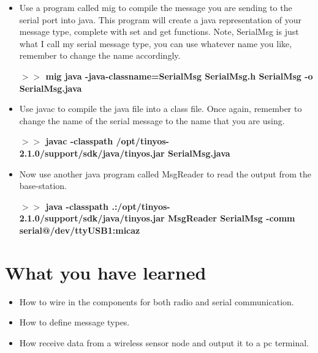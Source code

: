 \documentclass [a4] {article}
\begin{document}
\begin{itemize}
\item Use a program called mig to compile the message you are sending to the serial port into java. This program will create a java representation of your message type, complete with set and get functions. Note, SerialMsg is just what I call my serial message type, you can use whatever name you like, remember to change the name accordingly.

\textbf{$>>$ mig java -java-classname=SerialMsg SerialMsg.h SerialMsg -o SerialMsg.java} \\


\item Use javac to compile the java file into a class file. Once again, remember to change the name of the serial message to the name that you are using.

\textbf{$>>$ javac -classpath /opt/tinyos-2.1.0/support/sdk/java/tinyos.jar SerialMsg.java} \\


\item Now use another java program called MsgReader to read the output from the base-station. 

\textbf{$>>$ java -classpath .:/opt/tinyos-2.1.0/support/sdk/java/tinyos.jar MsgReader SerialMsg -comm serial@/dev/ttyUSB1:micaz } \\


\end{itemize}

\section{What you have learned}

\begin{itemize}

\item How to wire in the components for both radio and serial communication.
\item How to define message types.
\item How receive data from a wireless sensor node and output it to a pc terminal.

\end{itemize}
\end{document}
